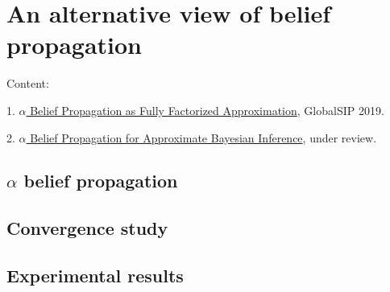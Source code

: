 \chapter{An alternative view of belief propagation}
Content:

1. \href{https://ieeexplore.ieee.org/abstract/document/8969545}{$\alpha$ Belief Propagation as Fully Factorized Approximation}, GlobalSIP 2019.

2. \href{https://github.com/FirstHandScientist/alpha-bp/blob/submit_icml/manuscript/main.pdf}{$\alpha$ Belief Propagation for Approximate Bayesian Inference}, under review.

\section{$\alpha$ belief propagation}

\section{Convergence study}

\section{Experimental results}



